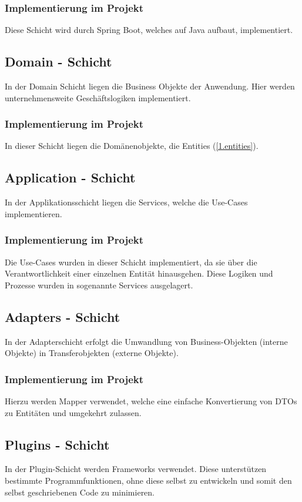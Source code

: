     		\subsubsection{Implementierung im Projekt}
    		Diese Schicht wird durch Spring Boot, welches auf Java aufbaut, implementiert. 
    	
    	\subsection{Domain - Schicht}
    	In der Domain Schicht liegen die Business Objekte der Anwendung. Hier werden unternehmensweite Geschäftslogiken implementiert.
    		\subsubsection{Implementierung im Projekt}
    		In dieser Schicht liegen die Domänenobjekte, die Entities (\cref{1.entities}).
    	
    	\subsection{Application - Schicht}
    	In der Applikationsschicht liegen die Services, welche die Use-Cases implementieren.
    		\subsubsection{Implementierung im Projekt}
    		Die Use-Cases wurden in dieser Schicht implementiert, da sie über die Verantwortlichkeit einer einzelnen Entität hinausgehen. Diese Logiken und Prozesse wurden in sogenannte Services ausgelagert.
    	
    	\subsection{Adapters - Schicht}
    	In der Adapterschicht erfolgt die Umwandlung von Business-Objekten (interne Objekte) in Transferobjekten (externe Objekte).
    		\subsubsection{Implementierung im Projekt}
    		Hierzu werden Mapper verwendet, welche eine einfache Konvertierung von DTOs zu Entitäten und umgekehrt zulassen.
    		
    	\subsection{Plugins - Schicht}
    	In der Plugin-Schicht werden Frameworks verwendet. Diese unterstützen bestimmte Programmfunktionen, ohne diese selbst zu entwickeln und somit den selbst geschriebenen Code zu minimieren.
